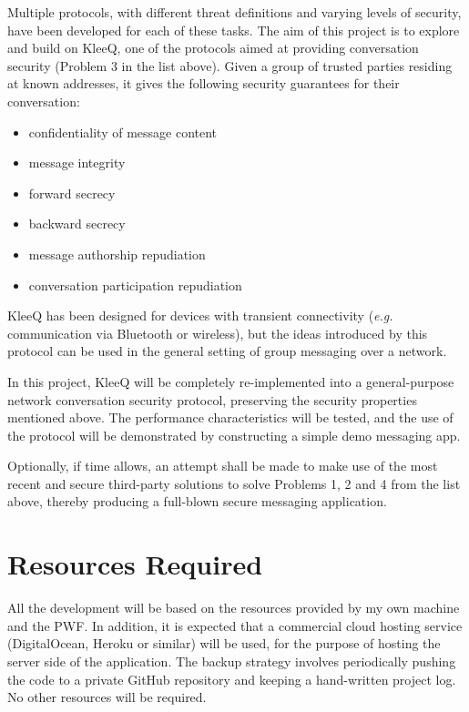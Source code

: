 \documentclass[a4paper, 12pt]{report}
\begin{document}
\begin{appendices}
\vspace{\baselineskip}
\noindent
Multiple protocols, with different threat definitions and varying levels of security, have been developed for each of these tasks. The aim of this project is to explore and build on KleeQ, one of the protocols aimed at providing conversation security (Problem 3 in the list above). Given a group of trusted parties residing at known addresses, it gives the following security guarantees for their conversation:
\begin{itemize}
    \item confidentiality of message content
    \item message integrity
    \item forward secrecy
    \item backward secrecy
    \item message authorship repudiation
    \item conversation participation repudiation
\end{itemize}
KleeQ has been designed for devices with transient connectivity (\textit{e.g.} communication via Bluetooth or wireless), but the ideas introduced by this protocol can be used in the general setting of group messaging over a network.

\vspace{\baselineskip}
\noindent
In this project, KleeQ will be completely re-implemented into a general-purpose network conversation security protocol, preserving the security properties mentioned above. The performance characteristics will be tested, and the use of the protocol will be demonstrated by constructing a simple demo messaging app.

\vspace{\baselineskip}
\noindent
Optionally, if time allows, an attempt shall be made to make use of the most recent and secure third-party solutions to solve Problems 1, 2 and 4 from the list above, thereby producing a full-blown secure messaging application.


\section{Resources Required}
All the development will be based on the resources provided by my own machine and the PWF. In addition, it is expected that a commercial cloud hosting service (DigitalOcean, Heroku or similar) will be used, for the purpose of hosting the server side of the application. The backup strategy involves periodically pushing the code to a private GitHub repository and keeping a hand-written project log. No other resources will be required.



\end{appendices}
\end{document}
